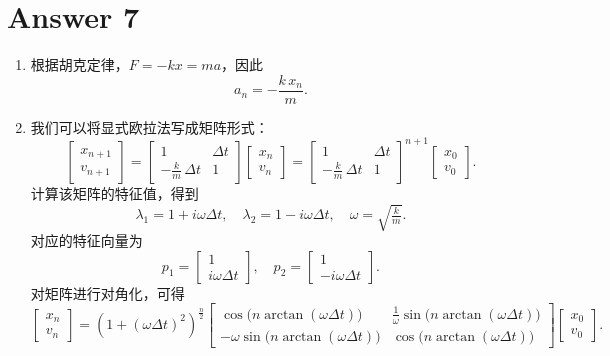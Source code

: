 \section*{Answer 7}
\begin{enumerate}
	\item 根据胡克定律，$F=-kx=ma$，因此
		\[
			a_n = -\frac{k\,x_n}{m}.
		\]
	\item 我们可以将显式欧拉法写成矩阵形式：
		\[
			\begin{bmatrix}x_{n+1}\\v_{n+1}\end{bmatrix}
			=
			\begin{bmatrix}
				1 & \Delta t\\
				-\tfrac{k}{m}\,\Delta t & 1
			\end{bmatrix}
			\begin{bmatrix}x_n\\v_n\end{bmatrix}
			=
			\begin{bmatrix}
				1 & \Delta t\\
				-\tfrac{k}{m}\,\Delta t & 1
			\end{bmatrix}^{n+1}
			\begin{bmatrix}x_0\\v_0\end{bmatrix}.
		\]
		计算该矩阵的特征值，得到
		\[
			\lambda_{1} = 1 + i\omega\Delta t,\quad
			\lambda_{2} = 1 - i\omega\Delta t,\quad
			\omega = \sqrt{\tfrac{k}{m}}.
		\]
		对应的特征向量为
		\[
			p_{1} = \begin{bmatrix}1\\i\omega\Delta t\end{bmatrix},\quad
			p_{2} = \begin{bmatrix}1\\-i\omega\Delta t\end{bmatrix}.
		\]
		对矩阵进行对角化，可得
		\[
			\begin{bmatrix}x_{n}\\v_{n}\end{bmatrix}
			=
			(1+(\omega\Delta t)^2)^{\frac n2}
			\begin{bmatrix}
				\cos\bigl(n\arctan(\omega\Delta t)\bigr) &
				\tfrac1\omega\sin\bigl(n\arctan(\omega\Delta t)\bigr)\\
				-\omega\sin\bigl(n\arctan(\omega\Delta t)\bigr) &
				\cos\bigl(n\arctan(\omega\Delta t)\bigr)
			\end{bmatrix}
			\begin{bmatrix}x_0\\v_0\end{bmatrix}.
\]
\end{enumerate}

